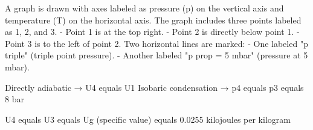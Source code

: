 A graph is drawn with axes labeled as pressure (p) on the vertical axis and temperature (T) on the horizontal axis. The graph includes three points labeled as 1, 2, and 3.  
- Point 1 is at the top right.  
- Point 2 is directly below point 1.  
- Point 3 is to the left of point 2.  
Two horizontal lines are marked:  
- One labeled "p triple" (triple point pressure).  
- Another labeled "p prop = 5 mbar" (pressure at 5 mbar).

Directly adiabatic → U4 equals U1  
Isobaric condensation → p4 equals p3 equals 8 bar  

U4 equals U3 equals Ug (specific value) equals 0.0255 kilojoules per kilogram